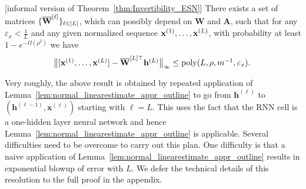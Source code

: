
\begin{theorem}\label{thm:Invertibility_ESN_outline}[informal version of Theorem~\ref{thm:Invertibility_ESN}]
	There exists a set of matrices $\{ \overline{\mathbf{W}}^{[\ell]} \}_{\ell \in [L]}$, which can possibly depend on $\mathbf{W}$ and $\mathbf{A}$, such that for any $\varepsilon_x < \frac{1}{L}$ and any given normalized sequence $\mathbf{x}^{(1)}, \ldots, \mathbf{x}^{(L)}$, 
	with probability at least $1 - e^{-\Omega(\rho^2)}$ we have
	$$
	\begin{array}{l}
		\norm[1]{[\mathbf{x}^{(1)}, \ldots, \mathbf{x}^{(L)}] - \overline{\mathbf{W}}^{[L]\top} \mathbf{h}^{(L)}}_\infty  \leq \mathrm{poly}(L, \rho, m^{-1}, \varepsilon_x).
	\end{array}
	$$
\end{theorem}
Very roughly, the above result is obtained by repeated application of Lemma~\ref{lem:normal_linearestimate_appr_outline} to go from $\mathbf{h}^{(\ell)}$ to $(\mathbf{h}^{(\ell-1)}, \mathbf{x}^{(\ell)})$ starting with $\ell = L$. This uses the fact that the RNN cell is a one-hidden layer neural network and hence Lemma~\ref{lem:normal_linearestimate_appr_outline} is applicable. Several difficulties need to be overcome to carry out this plan. One difficulty is that a naive application of Lemma~\ref{lem:normal_linearestimate_appr_outline}
results in exponential blowup of error with $L$. We defer the technical details of this resolution to the full proof in the appendix.
